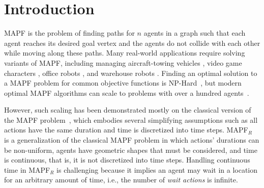 \documentclass[letterpaper]{article} %
\newcommand{\mapfr}{{MAPF}$_R$\xspace}
\newcommand{\mapf}{\ac{MAPF}\xspace}
\begin{document}
\begin{abstract}

\end{abstract}

\section{Introduction}

\acf{MAPF} is the problem of finding paths for $n$ agents in a graph such that 
each agent reaches its desired goal vertex and the agents do not collide with each other while moving along these paths. 
Many real-world applications require solving variants of \mapf, 
including managing aircraft-towing vehicles \cite{MorrisPLMMKK16}, video game characters \cite{Silver05}, office robots \cite{VelosoBCR15}, and warehouse robots \cite{WurmanDM07}. 
Finding an optimal solution to a \mapf problem for common objective functions is NP-Hard~\cite{surynek2010optimization,yu2013structure}, 
but modern optimal \mapf algorithms can scale to problems with over a hundred agents~\cite{sharon2015conflict,BoyarskiFSSTBS15,felner2018adding,BCP,lazy-cbs,SurynekFSB16}.

However, such scaling has been demonstrated mostly on the classical version of the \mapf problem~\cite{stern2019multi}, which embodies several simplifying assumptions such as all actions have the same duration and time is discretized into time steps. \mapfr~\cite{walker2018extended} is a generalization of the classical \mapf problem in which actions' durations can be non-uniform, agents have geometric shapes that must be considered, and time is continuous, that is, it is not discretized into time steps. 
Handling continuous time in \mapfr is challenging because it implies an agent may wait in a location for an arbitrary amount of time, i.e., the number of \emph{wait actions} is infinite.  
\end{document}

